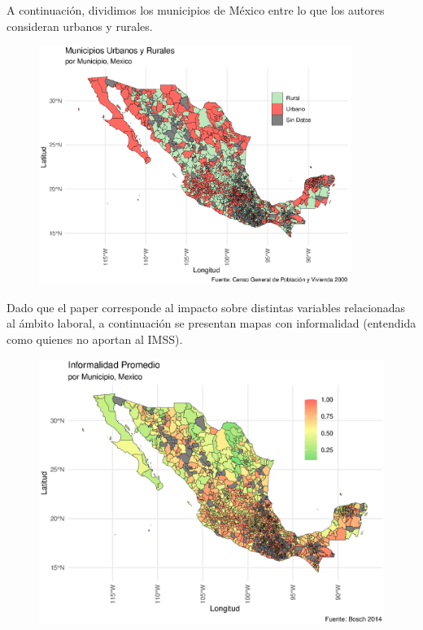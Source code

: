 \documentclass[9pt]{article}
\begin{document}
 A continuaci\'on, dividimos los municipios de M\'exico entre lo que los autores consideran urbanos y rurales.
    \begin{figure}[H]
     \centering
     \includegraphics[width=0.9\textwidth]{figs/Urbanos y Rurales.eps}
 \end{figure}
\newpage Dado que el paper corresponde al impacto sobre distintas variables relacionadas al ámbito laboral, a continuación se presentan mapas con informalidad (entendida como quienes no aportan al IMSS). 

\begin{figure}[H]
     \centering
     \includegraphics[width=\textwidth]{figs/inf.eps}
 \end{figure}
\end{document}
